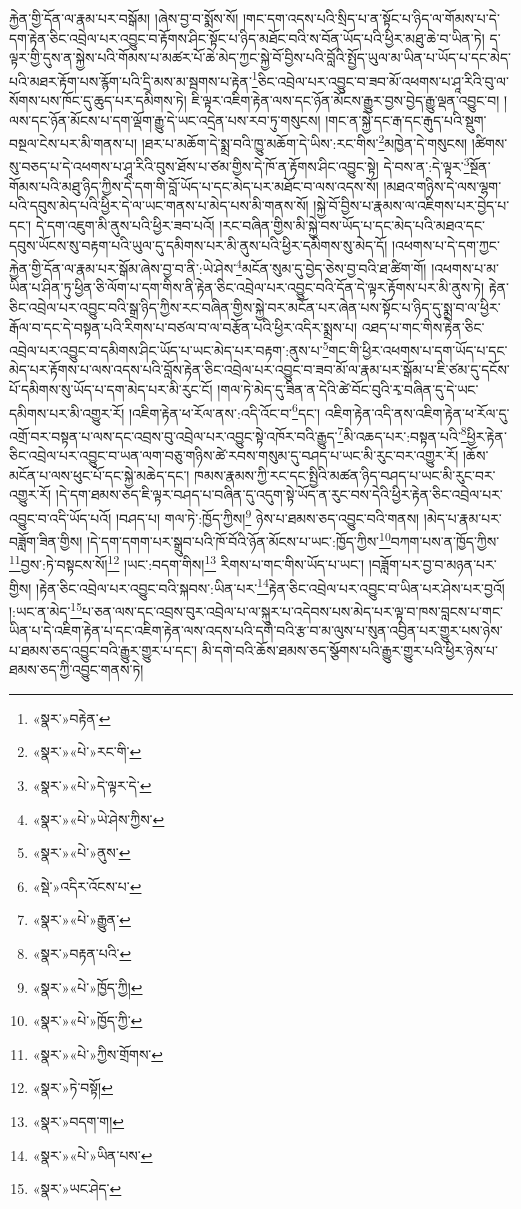 རྐྱེན་གྱི་དོན་ལ་རྣམ་པར་བསྒོམ། །ཞེས་བྱ་བ་སྨོས་སོ། །གང་དག་འདས་པའི་སྲིད་པ་ན་སྟོང་པ་ཉིད་ལ་གོམས་པ་དེ་དག་རྟེན་ཅིང་འབྲེལ་པར་འབྱུང་བ་རྟོགས་ཤིང་སྟོང་པ་ཉིད་མཐོང་བའི་ས་བོན་ཡོད་པའི་ཕྱིར་མཐུ་ཆེ་བ་ཡིན་ཏེ། ད་ལྟར་གྱི་དུས་ན་སྐྱེས་པའི་གོམས་པ་མཚར་པོ་ཆེ་མེད་ཀྱང་སྐྱེ་བོ་བྱིས་པའི་བློའི་སྤྱོད་ཡུལ་མ་ཡིན་པ་ཡོད་པ་དང་མེད་པའི་མཐར་རྟོག་པས་རྙོག་པའི་དྲི་མས་མ་སྦགས་པ་རྟེན་\footnote{«སྣར་»བརྟེན་}ཅིང་འབྲེལ་པར་འབྱུང་བ་ཟབ་མོ་འཕགས་པ་ཤཱ་རིའི་བུ་ལ་སོགས་པས་ཁོང་དུ་ཆུད་པར་དམིགས་ཏེ། ཇི་ལྟར་འཇིག་རྟེན་ལས་དང་ཉོན་མོངས་རྒྱུར་བྱས་བྱེད་རྒྱུ་ལྡན་འབྱུང་བ། །ལས་དང་ཉོན་མོངས་པ་དག་ལྡོག་རྒྱུ་དེ་ཡང་འདྲེན་པས་རབ་ཏུ་གསུངས། །གང་ན་སྐྱེ་དང་རྒ་དང་རྒུད་པའི་སྡུག་བསྔལ་ངེས་པར་མི་གནས་པ། །ཐར་པ་མཆོག་དེ་སྨྲ་བའི་ཁྱུ་མཆོག་དེ་ཡིས་:རང་གིས་\footnote{«སྣར་»«པེ་»རང་གི་}མཁྱེན་དེ་གསུངས། །ཚིགས་སུ་བཅད་པ་དེ་འཕགས་པ་ཤཱ་རིའི་བུས་ཐོས་པ་ཙམ་གྱིས་དེ་ཁོ་ན་རྟོགས་ཤིང་འབྱུང་སྟེ། དེ་བས་ན་:དེ་ལྟར་\footnote{«སྣར་»«པེ་»དེ་ལྟར་དེ་}སྔོན་གོམས་པའི་མཐུ་ཉིད་ཀྱིས་དེ་དག་གི་བློ་ཡོད་པ་དང་མེད་པར་མཐོང་བ་ལས་འདས་སོ། །མཐའ་གཉིས་དེ་ལས་ལྷག་པའི་དབུས་མེད་པའི་ཕྱིར་དེ་ལ་ཡང་གནས་པ་མེད་པས་མི་གནས་སོ། །སྐྱེ་བོ་བྱིས་པ་རྣམས་ལ་འཇིགས་པར་བྱེད་པ་དང་། དེ་དག་འཇུག་མི་ནུས་པའི་ཕྱིར་ཟབ་པའོ། །རང་བཞིན་གྱིས་མི་སྐྱེ་བས་ཡོད་པ་དང་མེད་པའི་མཐའ་དང་དབུས་ཡོངས་སུ་བརྟག་པའི་ཡུལ་དུ་དམིགས་པར་མི་ནུས་པའི་ཕྱིར་དམིགས་སུ་མེད་དོ། །འཕགས་པ་དེ་དག་ཀྱང་རྐྱེན་གྱི་དོན་ལ་རྣམ་པར་སྒོམ་ཞེས་བྱ་བ་ནི་:ཡེ་ཤེས་\footnote{«སྣར་»«པེ་»ཡེ་ཤེས་ཀྱིས་}མངོན་སུམ་དུ་བྱེད་ཅེས་བྱ་བའི་ཐ་ཚིག་གོ། །འཕགས་པ་མ་ཡིན་པ་ཤིན་ཏུ་ཕྱིན་ཅི་ལོག་པ་དག་གིས་ནི་རྟེན་ཅིང་འབྲེལ་པར་འབྱུང་བའི་དོན་དེ་ལྟར་རྟོགས་པར་མི་ནུས་ཏེ། རྟེན་ཅིང་འབྲེལ་པར་འབྱུང་བའི་སྒྲ་ཉིད་ཀྱིས་རང་བཞིན་གྱིས་སྐྱེ་བར་མངོན་པར་ཞེན་པས་སྟོང་པ་ཉིད་དུ་སྨྲ་བ་ལ་ཕྱིར་རྒོལ་བ་དང་དེ་བསྟན་པའི་རིགས་པ་བཙལ་བ་ལ་བརྩོན་པའི་ཕྱིར་འདིར་སྨྲས་པ། འཐད་པ་གང་གིས་རྟེན་ཅིང་འབྲེལ་པར་འབྱུང་བ་དམིགས་ཤིང་ཡོད་པ་ཡང་མེད་པར་བརྟག་:ནུས་པ་\footnote{«སྣར་»«པེ་»ནུས་}གང་གི་ཕྱིར་འཕགས་པ་དག་ཡོད་པ་དང་མེད་པར་རྟོགས་པ་ལས་འདས་པའི་བློས་རྟེན་ཅིང་འབྲེལ་པར་འབྱུང་བ་ཟབ་མོ་ལ་རྣམ་པར་སྒོམ་པ་ཇི་ཙམ་དུ་དངོས་པོ་དམིགས་སུ་ཡོད་པ་དག་མེད་པར་མི་རུང་ངོ། །གལ་ཏེ་མེད་དུ་ཟིན་ན་དེའི་ཚེ་བོང་བུའི་རྭ་བཞིན་དུ་དེ་ཡང་དམིགས་པར་མི་འགྱུར་རོ། །འཇིག་རྟེན་ཕ་རོལ་ནས་:འདི་འོང་བ་\footnote{«སྡེ་»འདིར་འོངས་པ་}དང་། འཇིག་རྟེན་འདི་ནས་འཇིག་རྟེན་ཕ་རོལ་དུ་འགྲོ་བར་བསྟན་པ་ལས་དང་འབྲས་བུ་འབྲེལ་པར་འབྱུང་སྟེ་འཁོར་བའི་རྒྱུད་\footnote{«སྣར་»«པེ་»རྒྱུན་}མི་འཆད་པར་:བསྟན་པའི་\footnote{«སྣར་»བརྟན་པའི་}ཕྱིར་རྟེན་ཅིང་འབྲེལ་པར་འབྱུང་བ་ཡན་ལག་བཅུ་གཉིས་ཚེ་རབས་གསུམ་དུ་བཤད་པ་ཡང་མི་རུང་བར་འགྱུར་རོ། །ཆོས་མངོན་པ་ལས་ཕུང་པོ་དང་སྐྱེ་མཆེད་དང་། ཁམས་རྣམས་ཀྱི་རང་དང་སྤྱིའི་མཚན་ཉིད་བཤད་པ་ཡང་མི་རུང་བར་འགྱུར་རོ། །དེ་དག་ཐམས་ཅད་ཇི་ལྟར་བཤད་པ་བཞིན་དུ་འདུག་སྟེ་ཡོད་ན་རུང་བས་དེའི་ཕྱིར་རྟེན་ཅིང་འབྲེལ་པར་འབྱུང་བ་འདི་ཡོད་པའོ། །བཤད་པ། གལ་ཏེ་:ཁྱོད་ཀྱིས།\footnote{«སྣར་»«པེ་»ཁྱོད་ཀྱི།} ཉེས་པ་ཐམས་ཅད་འབྱུང་བའི་གནས། །མེད་པ་རྣམ་པར་བཟློག་ཟིན་གྱིས། །དེ་དག་དགག་པར་སྒྲུབ་པའི་ཁོ་བོའི་ཉོན་མོངས་པ་ཡང་:ཁྱོད་ཀྱིས་\footnote{«སྣར་»«པེ་»ཁྱོད་ཀྱི་}བཀག་པས་ན་ཁྱོད་ཀྱིས་\footnote{«སྣར་»«པེ་»ཀྱིས་གྲོགས་}བྱས་:ཏེ་བསྟངས་སོ།\footnote{«སྣར་»ཏེ་བསྟོ།} །ཡང་:བདག་གིས།\footnote{«སྣར་»བདག་ག།} རིགས་པ་གང་གིས་ཡོད་པ་ཡང་། །བཟློག་པར་བྱ་བ་མཉན་པར་གྱིས། །རྟེན་ཅིང་འབྲེལ་པར་འབྱུང་བའི་སྐབས་:ཡིན་པར་\footnote{«སྣར་»«པེ་»ཡིན་པས་}རྟེན་ཅིང་འབྲེལ་པར་འབྱུང་བ་ཡིན་པར་ཤེས་པར་བྱའོ། །:ཡང་ན་མེད་\footnote{«སྣར་»ཡང་ཤེད་}པ་ཅན་ལས་དང་འབྲས་བུར་འབྲེལ་པ་ལ་སྐུར་པ་འདེབས་པས་མེད་པར་ལྟ་བ་ཁས་བླངས་པ་གང་ཡིན་པ་དེ་འཇིག་རྟེན་པ་དང་འཇིག་རྟེན་ལས་འདས་པའི་དགེ་བའི་རྩ་བ་མ་ལུས་པ་སུན་འབྱིན་པར་གྱུར་པས་ཉེས་པ་ཐམས་ཅད་འབྱུང་བའི་རྒྱུར་གྱུར་པ་དང་། མི་དགེ་བའི་ཆོས་ཐམས་ཅད་སྩོགས་པའི་རྒྱུར་གྱུར་པའི་ཕྱིར་ཉེས་པ་ཐམས་ཅད་ཀྱི་འབྱུང་གནས་ཏེ། 